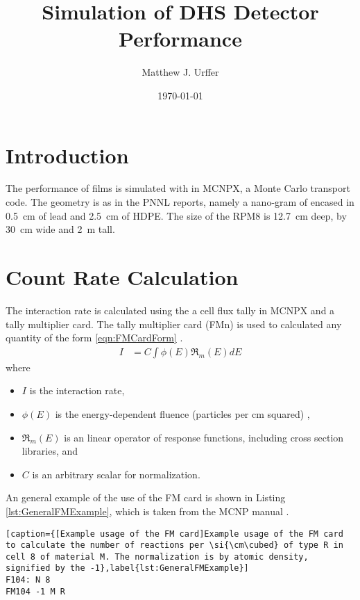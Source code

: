 \documentclass[draftcls,onecolumn]{IEEEtran}
\begin{document}
\title{Simulation of DHS Detector Performance}
\author{Matthew J. Urffer}
\date{\today}
\maketitle

\printnomenclature
\printindex

\listoftodos
\tableofcontents
\listoffigures
\listoftables
\lstlistoflistings
\section{Introduction}

The performance of films is simulated with in MCNPX, a Monte Carlo transport code\cite{pelowitz_mcnpx_????}.
The geometry is as in the PNNL reports, namely a nano-gram of   encased in \SI{0.5}{\cm} of lead and \SI{2.5}{\cm} of HDPE. 
The size of the RPM8 is \SI{12.7}{\cm} deep, by \SI{30}{\cm} wide and \SI{2}{\m} tall.

\section{Count Rate Calculation}
The interaction rate is calculated using the a cell flux tally in MCNPX and a tally multiplier card.
The tally multiplier card (FMn) is used to calculated any quantity of the form \eqref{eqn:FMCardForm} \cite{pelowitz_mcnpx_????}.
\begin{align}
  \label{eqn:FMCardForm}
  I &= C\int\phi(E)\Re_m(E)dE
\end{align}
where
\begin{itemize}
  \item [] $I$ is the interaction rate,
  \item [] $\phi(E)$ is the energy-dependent fluence (particles per cm squared) ,
  \item [] $\Re_m (E)$ is an linear operator of response functions, including cross section libraries, and
  \item [] $C$ is an arbitrary scalar for normalization.
\end{itemize}
An general example of the use of the FM card is shown in Listing \ref{lst:GeneralFMExample}, which is taken from the MCNP manual \cite{pelowitz_mcnpx_????}.
\begin{lstlisting}[caption={[Example usage of the FM card]Example usage of the FM card to calculate the number of reactions per \si{\cm\cubed} of type R in cell 8 of material M. The normalization is by atomic density, signified by the -1},label{lst:GeneralFMExample}]
F104: N 8
FM104 -1 M R
\end{lstlisting}
\end{document}
